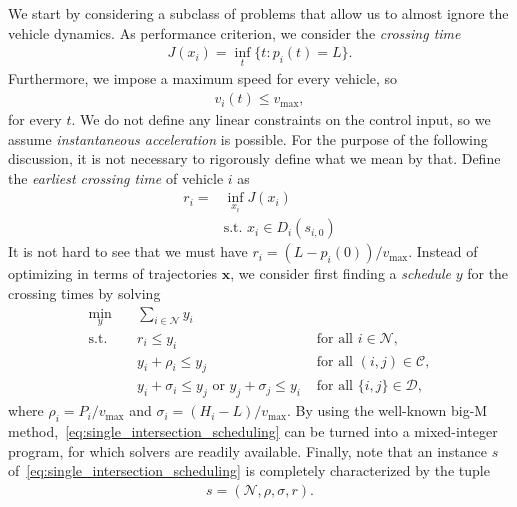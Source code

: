 \documentclass[a4paper]{article}
\theoremstyle{definition}
\theoremstyle{plain}
\begin{document}
We start by considering a subclass of problems that allow us to almost ignore
the vehicle dynamics. As performance criterion, we consider the \textit{crossing
  time}
\begin{align}
  \label{eq:crossing_time_criterion}
  J(x_{i}) = \inf_{t} \{ t : p_{i}(t) = L \} .
\end{align}
Furthermore, we impose a maximum speed for every vehicle, so
\begin{align}
  \label{eq:max_speed_constraint}
  v_{i}(t) \leq v_\text{max} ,
\end{align}
for every $t$. We do not define any linear constraints on the control input, so
we assume \textit{instantaneous acceleration} is possible. For the purpose of
the following discussion, it is not necessary to rigorously define what we mean
by that. Define the \textit{earliest crossing time} of vehicle $i$ as
\begin{align*}
  r_{i} = &\inf_{x_{i}} J(x_{i}) \\
  &\text{s.t. } x_{i} \in D_{i}(s_{i,0})
\end{align*}
It is not hard to see that we must have $r_{i} = (L - p_{i}(0)) / v_\text{max}$.
%
Instead of optimizing in terms of trajectories $\mathbf{x}$, we consider first
finding a \textit{schedule} $y$ for the crossing times by solving
\begin{subequations}\label{eq:single_intersection_scheduling}
\begin{align}
  \min_{y} \quad & \sum_{i \in \mathcal{N}} y_{i} & \\
  \text{s.t.} \quad & r_{i} \leq y_{i} & \text{ for all } i \in \mathcal{N} , \\
  & y_{i} + \rho_{i} \leq y_{j} & \text{ for all } (i,j) \in \mathcal{C} , \label{eq:conjunctions} \\
  & y_{i} + \sigma_{i} \leq y_{j} \text{ or } y_{j} + \sigma_{j} \leq y_{i} & \text{ for all } \{i,j\} \in \mathcal{D} , \label{eq:disjunctions}
\end{align}
\end{subequations}
where $\rho_{i} = P_{i} / v_{\text{max}}$ and
$\sigma_{i} = (H_{i} - L) / v_{\text{max}}$. By using the well-known big-M
method,~\eqref{eq:single_intersection_scheduling} can be turned into a
mixed-integer program, for which solvers are readily available.
%
Finally, note that an instance $s$ of~\eqref{eq:single_intersection_scheduling}
is completely characterized by the tuple
\begin{align*}
  s = (\mathcal{N}, \rho, \sigma, r) .
\end{align*}
\end{document}
